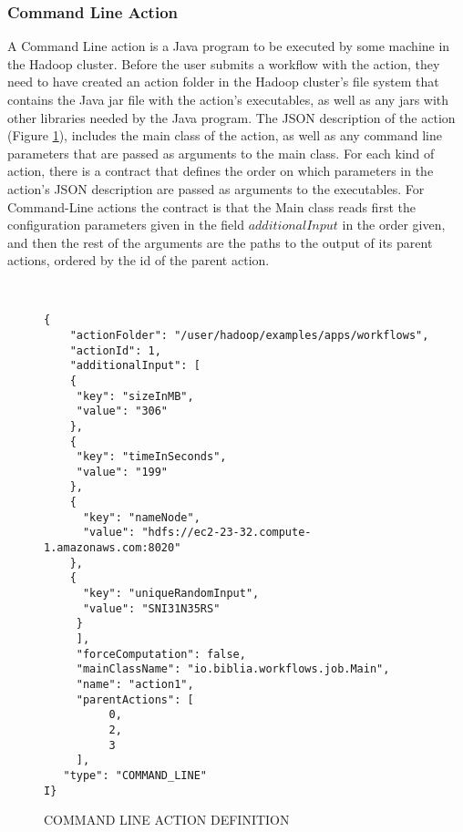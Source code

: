 \subsubsection{Command Line Action}
A Command Line action is a Java program to be executed by some machine in the Hadoop cluster.  Before the user submits a workflow with the action, they need to have created an action folder in the Hadoop cluster's file system that contains the Java jar file with the action's executables, as well as any jars with other libraries needed by the Java program.  The JSON description of the action (Figure \ref{fig:command_line_action_definition}), includes the main class of the action, as well as any command line parameters that are passed as arguments to the main class. For each kind of action, there is a contract that defines the order on which parameters in the action's JSON description are passed as arguments to the executables. For Command-Line actions the contract is that the Main class reads first the configuration parameters given in the field $additionalInput$ in the order given, and then the rest of the arguments are the paths to the output of its parent actions, ordered by the id of the parent action.
\begin{figure}
\begin{mdframed}
\begin{singlespace}
\begin{verbatim}


{
    "actionFolder": "/user/hadoop/examples/apps/workflows", 
    "actionId": 1, 
    "additionalInput": [
    {
     "key": "sizeInMB",
     "value": "306"
    }, 
    {
     "key": "timeInSeconds", 
     "value": "199"
    }, 
    {
      "key": "nameNode", 
      "value": "hdfs://ec2-23-32.compute-1.amazonaws.com:8020"
    }, 
    {
      "key": "uniqueRandomInput", 
      "value": "SNI31N35RS"
     }
     ], 
     "forceComputation": false, 
     "mainClassName": "io.biblia.workflows.job.Main", 
     "name": "action1", 
     "parentActions": [
          0, 
          2, 
          3
     ], 
   "type": "COMMAND_LINE"
I}
\end{verbatim}
\end{singlespace}
\end{mdframed}
\caption{COMMAND LINE ACTION DEFINITION}
\label{fig:command_line_action_definition}
\end{figure}

